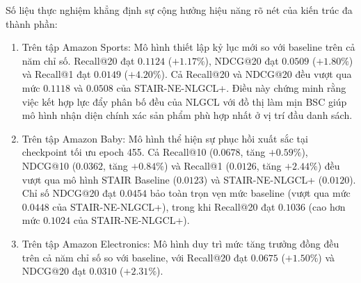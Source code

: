 Số liệu thực nghiệm khẳng định sự cộng hưởng hiệu năng rõ nét của kiến trúc đa thành phần:
\begin{enumerate}[leftmargin=*]
    \item Trên tập Amazon Sports: Mô hình thiết lập kỷ lục mới so với baseline trên cả năm chỉ số. Recall@20 đạt $0.1124$ ($+1.17\%$), NDCG@20 đạt $0.0509$ ($+1.80\%$) và Recall@1 đạt $0.0149$ ($+4.20\%$). Cả Recall@20 và NDCG@20 đều vượt qua mức $0.1118$ và $0.0508$ của STAIR-NE-NLGCL+. Điều này chứng minh rằng việc kết hợp lực đẩy phân bố đều của NLGCL với đồ thị làm mịn BSC giúp mô hình nhận diện chính xác sản phẩm phù hợp nhất ở vị trí đầu danh sách.
    \item Trên tập Amazon Baby: Mô hình thể hiện sự phục hồi xuất sắc tại checkpoint tối ưu epoch 455. Cả Recall@10 ($0.0678$, tăng $+0.59\%$), NDCG@10 ($0.0362$, tăng $+0.84\%$) và Recall@1 ($0.0126$, tăng $+2.44\%$) đều vượt qua mô hình STAIR Baseline ($0.0123$) và STAIR-NE-NLGCL+ ($0.0120$). Chỉ số NDCG@20 đạt $0.0454$ bảo toàn trọn vẹn mức baseline (vượt qua mức $0.0448$ của STAIR-NE-NLGCL+), trong khi Recall@20 đạt $0.1036$ (cao hơn mức $0.1024$ của STAIR-NE-NLGCL+).
    \item Trên tập Amazon Electronics: Mô hình duy trì mức tăng trưởng đồng đều trên cả năm chỉ số so với baseline, với Recall@20 đạt $0.0675$ ($+1.50\%$) và NDCG@20 đạt $0.0310$ ($+2.31\%$).
\end{enumerate}

